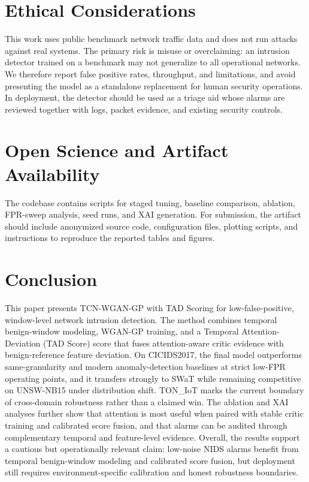 \documentclass[conference]{IEEEtran}
\newcommand{\model}{TCN-WGAN-GP with TAD Scoring}
\newcommand{\tad}{TAD Score}
\begin{document}
\section{Ethical Considerations}
This work uses public benchmark network traffic data and does not run attacks against real systems. The primary risk is misuse or overclaiming: an intrusion detector trained on a benchmark may not generalize to all operational networks. We therefore report false positive rates, throughput, and limitations, and avoid presenting the model as a standalone replacement for human security operations. In deployment, the detector should be used as a triage aid whose alarms are reviewed together with logs, packet evidence, and existing security controls.

\section{Open Science and Artifact Availability}
The codebase contains scripts for staged tuning, baseline comparison, ablation, FPR-sweep analysis, seed runs, and XAI generation. For submission, the artifact should include anonymized source code, configuration files, plotting scripts, and instructions to reproduce the reported tables and figures.

\section{Conclusion}
This paper presents \model{} for low-false-positive, window-level network intrusion detection. The method combines temporal benign-window modeling, WGAN-GP training, and a Temporal Attention-Deviation (\tad{}) score that fuses attention-aware critic evidence with benign-reference feature deviation. On CICIDS2017, the final model outperforms same-granularity and modern anomaly-detection baselines at strict low-FPR operating points, and it transfers strongly to SWaT while remaining competitive on UNSW-NB15 under distribution shift. TON\_IoT marks the current boundary of cross-domain robustness rather than a claimed win. The ablation and XAI analyses further show that attention is most useful when paired with stable critic training and calibrated score fusion, and that alarms can be audited through complementary temporal and feature-level evidence. Overall, the results support a cautious but operationally relevant claim: low-noise NIDS alarms benefit from temporal benign-window modeling and calibrated score fusion, but deployment still requires environment-specific calibration and honest robustness boundaries.



\end{document}
